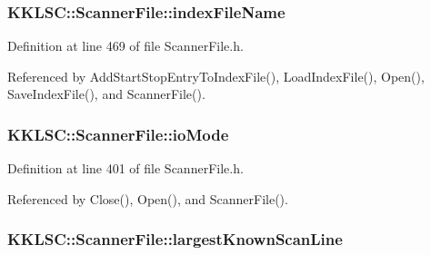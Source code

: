 \subsubsection[{\texorpdfstring{index\+File\+Name}{indexFileName}}]{ K\+K\+L\+S\+C\+::\+Scanner\+File\+::index\+File\+Name\hspace{0.3cm}{\ttfamily [protected]}}\hypertarget{class_k_k_l_s_c_1_1_scanner_file_a3ef604628bb0a487663326f93845c10e}{}\label{class_k_k_l_s_c_1_1_scanner_file_a3ef604628bb0a487663326f93845c10e}


Definition at line 469 of file Scanner\+File.\+h.



Referenced by Add\+Start\+Stop\+Entry\+To\+Index\+File(), Load\+Index\+File(), Open(), Save\+Index\+File(), and Scanner\+File().

\subsubsection[{\texorpdfstring{io\+Mode}{ioMode}}]{ K\+K\+L\+S\+C\+::\+Scanner\+File\+::io\+Mode\hspace{0.3cm}{\ttfamily [protected]}}\hypertarget{class_k_k_l_s_c_1_1_scanner_file_a27ace8affebc2688586de9b72dd0de87}{}\label{class_k_k_l_s_c_1_1_scanner_file_a27ace8affebc2688586de9b72dd0de87}


Definition at line 401 of file Scanner\+File.\+h.



Referenced by Close(), Open(), and Scanner\+File().

\subsubsection[{\texorpdfstring{largest\+Known\+Scan\+Line}{largestKnownScanLine}}]{ K\+K\+L\+S\+C\+::\+Scanner\+File\+::largest\+Known\+Scan\+Line\hspace{0.3cm}{\ttfamily [protected]}}\hypertarget{class_k_k_l_s_c_1_1_scanner_file_a1f3173b38229a4f3035a2674c4263a2c}{}\label{class_k_k_l_s_c_1_1_scanner_file_a1f3173b38229a4f3035a2674c4263a2c}


